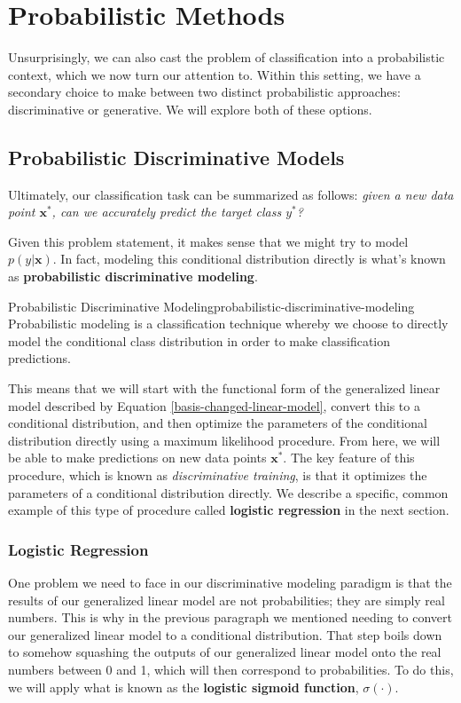 \section{Probabilistic Methods}
Unsurprisingly, we can also cast the problem of classification into a probabilistic context, which we now turn our attention to. Within this setting, we have a secondary choice to make between two distinct probabilistic approaches: discriminative or generative. We will explore both of these options.

\subsection{Probabilistic Discriminative Models}
Ultimately, our classification task can be summarized as follows: \textit{given a new data point $\textbf{x}^{*}$, can we accurately predict the target class $y^{*}$?}

Given this problem statement, it makes sense that we might try to model $p(y|\textbf{x})$. In fact, modeling this conditional distribution directly is what's known as \textbf{probabilistic discriminative modeling}.

\begin{definition}{Probabilistic Discriminative Modeling}{probabilistic-discriminative-modeling}
    Probabilistic modeling is a classification technique whereby we choose to directly model the conditional class distribution in order to make classification predictions.
\end{definition}

This means that we will start with the functional form of the generalized linear model described by Equation \ref{basis-changed-linear-model}, convert this to a conditional distribution, and then optimize the parameters of the conditional distribution directly using a maximum likelihood procedure. From here, we will be able to make predictions on new data points $\textbf{x}^{*}$. The key feature of this procedure, which is known as \textit{discriminative training}, is that it optimizes the parameters of a conditional distribution directly. We describe a specific, common example of this type of procedure called \textbf{logistic regression} in the next section.

\subsubsection{Logistic Regression}
One problem we need to face in our discriminative modeling paradigm is that the results of our generalized linear model are not probabilities; they are simply real numbers. This is why in the previous paragraph we mentioned needing to convert our generalized linear model to a conditional distribution. That step boils down to somehow squashing the outputs of our generalized linear model onto the real numbers between 0 and 1, which will then correspond to probabilities. To do this, we will apply what is known as the \textbf{logistic sigmoid function}, $\sigma(\cdot)$.

